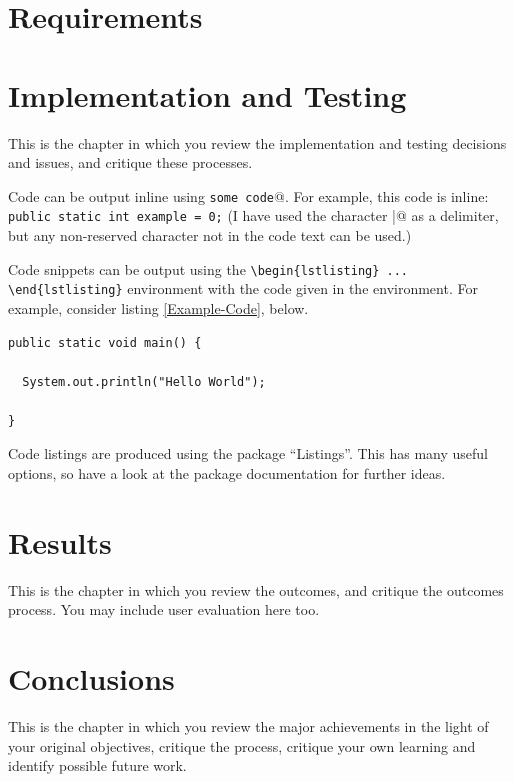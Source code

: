 \documentclass[11pt,openright,a4paper]{report}
\begin{document}
\chapter{Requirements}
\chapter{Implementation and Testing}
This is the chapter in which you review the implementation and testing
decisions and issues, and critique these processes.

Code can be output inline using \verb@\lstinline|some code|@.  For example,
this code is inline: \lstinline|public static int example = 0;|  (I have
used the character \verb@|@ as a delimiter, but any non-reserved character
not in the code text can be used.)

Code snippets can be output using the \verb|\begin{lstlisting} ... \end{lstlisting}|
environment with the code given in the environment.  For
example, consider listing \ref{Example-Code}, below.

\begin{lstlisting}[breaklines,breakatwhitespace,caption={Example code},label=Example-Code]
public static void main() {

  System.out.println("Hello World");

}
\end{lstlisting}

Code listings are produced using the package ``Listings''.  This has many
useful options, so have a look at the package documentation for further
ideas.


\chapter{Results}
This is the chapter in which you review the outcomes, and
critique the outcomes process.  You may include user evaluation here
too.



\chapter{Conclusions}
%

This is the chapter in which you review the major achievements in the
light of your original objectives, critique the process, critique your
own learning and identify possible future work.
\end{document}
